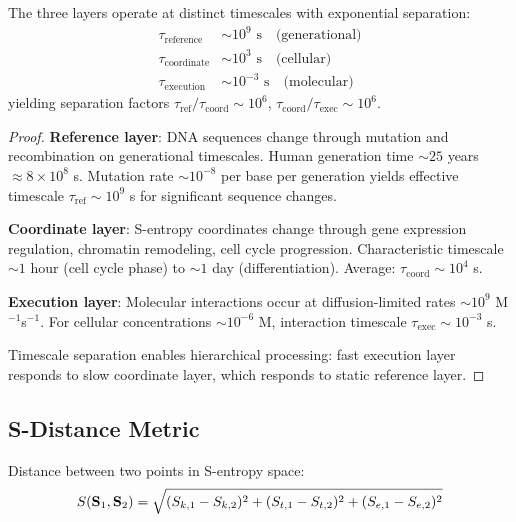 \begin{theorem}
\label{thm:layer_separation}
The three layers operate at distinct timescales with exponential separation:
\begin{align}
\tau_{\text{reference}} &\sim 10^9 \text{ s} \quad \text{(generational)} \\
\tau_{\text{coordinate}} &\sim 10^3 \text{ s} \quad \text{(cellular)} \\
\tau_{\text{execution}} &\sim 10^{-3} \text{ s} \quad \text{(molecular)}
\end{align}
yielding separation factors $\tau_{\text{ref}}/\tau_{\text{coord}} \sim 10^6$, $\tau_{\text{coord}}/\tau_{\text{exec}} \sim 10^6$.
\end{theorem}

\begin{proof}
\textbf{Reference layer}: DNA sequences change through mutation and recombination on generational timescales. Human generation time $\sim 25$ years $\approx 8 \times 10^8$ s. Mutation rate $\sim 10^{-8}$ per base per generation yields effective timescale $\tau_{\text{ref}} \sim 10^9$ s for significant sequence changes.

\textbf{Coordinate layer}: S-entropy coordinates change through gene expression regulation, chromatin remodeling, cell cycle progression. Characteristic timescale $\sim 1$ hour (cell cycle phase) to $\sim 1$ day (differentiation). Average: $\tau_{\text{coord}} \sim 10^4$ s.

\textbf{Execution layer}: Molecular interactions occur at diffusion-limited rates $\sim 10^9$ M$^{-1}$s$^{-1}$. For cellular concentrations $\sim 10^{-6}$ M, interaction timescale $\tau_{\text{exec}} \sim 10^{-3}$ s.

Timescale separation enables hierarchical processing: fast execution layer responds to slow coordinate layer, which responds to static reference layer.
\end{proof}

\subsection{S-Distance Metric}

\begin{definition}[S-Distance]
\label{def:s_distance}
Distance between two points in S-entropy space:
\begin{equation}
S(\mathbf{S}_1, \mathbf{S}_2) = \sqrt{(S_{k,1} - S_{k,2})^2 + (S_{t,1} - S_{t,2})^2 + (S_{e,1} - S_{e,2})^2}
\end{equation}
\end{definition}

